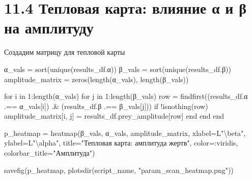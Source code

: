 \documentclass[
  12pt,
  a4paper,
  DIV=11,
  numbers=noendperiod]{scrreprt}
\newenvironment{Shaded}{\begin{snugshade}}{\end{snugshade}}
\newcommand{\ControlFlowTok}[1]{\textcolor[rgb]{0.00,0.23,0.31}{#1}}
\newcommand{\FloatTok}[1]{\textcolor[rgb]{0.68,0.00,0.00}{#1}}
\newcommand{\FunctionTok}[1]{\textcolor[rgb]{0.28,0.35,0.67}{#1}}
\newcommand{\KeywordTok}[1]{\textcolor[rgb]{0.00,0.23,0.31}{#1}}
\newcommand{\NormalTok}[1]{\textcolor[rgb]{0.00,0.23,0.31}{#1}}
\newcommand{\OperatorTok}[1]{\textcolor[rgb]{0.37,0.37,0.37}{#1}}
\newcommand{\SpecialCharTok}[1]{\textcolor[rgb]{0.37,0.37,0.37}{#1}}
\newcommand{\StringTok}[1]{\textcolor[rgb]{0.13,0.47,0.30}{#1}}
\begin{document}
\section{11.4 Тепловая карта: влияние α и β на
амплитуду}\label{ux442ux435ux43fux43bux43eux432ux430ux44f-ux43aux430ux440ux442ux430-ux432ux43bux438ux44fux43dux438ux435-ux3b1-ux438-ux3b2-ux43dux430-ux430ux43cux43fux43bux438ux442ux443ux434ux443}

Создадим матрицу для тепловой карты

\begin{Shaded}
\begin{Highlighting}[]
\NormalTok{α\_vals }\OperatorTok{=} \FunctionTok{sort}\NormalTok{(}\FunctionTok{unique}\NormalTok{(results\_df.α))}
\NormalTok{β\_vals }\OperatorTok{=} \FunctionTok{sort}\NormalTok{(}\FunctionTok{unique}\NormalTok{(results\_df.β))}
\NormalTok{amplitude\_matrix }\OperatorTok{=} \FunctionTok{zeros}\NormalTok{(}\FunctionTok{length}\NormalTok{(α\_vals), }\FunctionTok{length}\NormalTok{(β\_vals))}

\ControlFlowTok{for}\NormalTok{ i }\KeywordTok{in} \FloatTok{1}\OperatorTok{:}\FunctionTok{length}\NormalTok{(α\_vals)}
    \ControlFlowTok{for}\NormalTok{ j }\KeywordTok{in} \FloatTok{1}\OperatorTok{:}\FunctionTok{length}\NormalTok{(β\_vals)}
\NormalTok{        row }\OperatorTok{=} \FunctionTok{findfirst}\NormalTok{((results\_df.α }\OperatorTok{.==}\NormalTok{ α\_vals[i]) }\OperatorTok{.\&}
\NormalTok{                        (results\_df.β }\OperatorTok{.==}\NormalTok{ β\_vals[j]))}
        \ControlFlowTok{if}\NormalTok{ !}\FunctionTok{isnothing}\NormalTok{(row)}
\NormalTok{            amplitude\_matrix[i, j] }\OperatorTok{=}\NormalTok{ results\_df.prey\_amplitude[row]}
        \ControlFlowTok{end}
    \ControlFlowTok{end}
\ControlFlowTok{end}

\NormalTok{p\_heatmap }\OperatorTok{=} \FunctionTok{heatmap}\NormalTok{(β\_vals, α\_vals, amplitude\_matrix,}
\NormalTok{    xlabel}\OperatorTok{=}\NormalTok{L}\StringTok{"}\SpecialCharTok{\textbackslash{}b}\StringTok{eta"}\NormalTok{,}
\NormalTok{    ylabel}\OperatorTok{=}\NormalTok{L}\StringTok{"}\SpecialCharTok{\textbackslash{}a}\StringTok{lpha"}\NormalTok{,}
\NormalTok{    title}\OperatorTok{=}\StringTok{"Тепловая карта: амплитуда жертв"}\NormalTok{,}
\NormalTok{    color}\OperatorTok{=:}\NormalTok{viridis,}
\NormalTok{    colorbar\_title}\OperatorTok{=}\StringTok{"Амплитуда"}\NormalTok{)}

\FunctionTok{savefig}\NormalTok{(p\_heatmap, }\FunctionTok{plotsdir}\NormalTok{(script\_name, }\StringTok{"param\_scan\_heatmap.png"}\NormalTok{))}
\end{Highlighting}
\end{Shaded}
\end{document}
